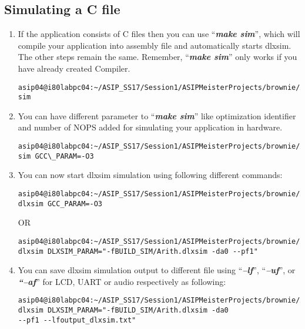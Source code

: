 \subsection{Simulating a C file}
\begin{enumerate}[resume]
\item If the application consists of C files then you can use
	``\emph{\textbf{make sim}}'', which will compile your application into
	assembly file and automatically starts dlxsim. The other steps remain
	the same. Remember, ``\emph{\textbf{make sim}}'' only works if you
	have already created Compiler.
\begin{lstlisting}
asip04@i80labpc04:~/ASIP_SS17/Session1/ASIPMeisterProjects/brownie/Applications/Arith:$make
sim
\end{lstlisting}
\item You can have different parameter to ``\emph{\textbf{make sim}}'' like
	optimization identifier and number of NOPS added for simulating your
	application in hardware.
\begin{lstlisting}
asip04@i80labpc04:~/ASIP_SS17/Session1/ASIPMeisterProjects/brownie/Applications/Arith:$make
sim GCC\_PARAM=-O3
\end{lstlisting}
\item	You can now start dlxsim simulation using following different
	commands:
\begin{lstlisting}
asip04@i80labpc04:~/ASIP_SS17/Session1/ASIPMeisterProjects/brownie/Applications/Arith:$make dlxsim GCC_PARAM=-O3
\end{lstlisting}
OR
\begin{lstlisting}
asip04@i80labpc04:~/ASIP_SS17/Session1/ASIPMeisterProjects/brownie/Applications/Arith:$make
dlxsim DLXSIM_PARAM="-fBUILD_SIM/Arith.dlxsim -da0 --pf1"
\end{lstlisting}
\color{red}
\item \normalcolor You can save dlxsim simulation output to different file using
	``\emph{\textbf{--lf}}'', ``\emph{\textbf{--uf}}'', or
	\emph{\textbf{``--af}}'' for LCD, UART or audio respectively as
	following:
\begin{lstlisting}
asip04@i80labpc04:~/ASIP_SS17/Session1/ASIPMeisterProjects/brownie/Applications/Arith:$make
dlxsim DLXSIM_PARAM="-fBUILD_SIM/Arith.dlxsim -da0
--pf1 --lfoutput_dlxsim.txt"
\end{lstlisting}
\end{enumerate}